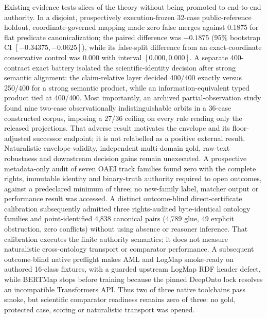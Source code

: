 Existing evidence tests slices of the theory without being promoted to
end-to-end authority. In a disjoint, prospectively execution-frozen 32-case
public-reference holdout, coordinate-governed mapping made zero false merges
against 0.1875 for flat predicate canonicalization; the paired difference was
$-0.1875$ (95\% bootstrap CI $[-0.34375,-0.0625]$), while its false-split
difference from an exact-coordinate conservative control was $0.000$ with
interval $[0.000,0.000]$. A separate 400-contract exact battery isolated the
scientific-identity decision after strong semantic alignment: the
claim-relative layer decided 400/400 exactly versus 250/400 for a strong
semantic product, while an information-equivalent typed product tied at
400/400. Most importantly, an archived partial-observation study found nine
two-case observationally indistinguishable orbits in a 36-case constructed
corpus, imposing a 27/36 ceiling on every rule reading only the released
projections. That adverse result motivates the envelope and its
floor-adjusted successor endpoint; it is not relabelled as a positive external
result. Naturalistic envelope validity, independent multi-domain gold,
raw-text robustness and downstream decision gains remain unexecuted. A
prospective metadata-only audit of seven OAEI track families found zero with
the complete rights, immutable identity and binary-truth authority required to
open outcomes, against a predeclared minimum of three; no new-family label,
matcher output or performance result was accessed. A distinct outcome-blind
direct-certificate calibration subsequently admitted three rights-audited
byte-identical ontology families and point-identified 4,838 canonical pairs
(4,789 glue, 49 explicit obstruction, zero conflicts) without using absence or
reasoner inference. That calibration executes the finite authority semantics;
it does not measure naturalistic cross-ontology transport or comparator
performance. A subsequent outcome-blind native preflight makes AML and LogMap
smoke-ready on authored 16-class fixtures, with a guarded upstream LogMap RDF
header defect, while BERTMap stops before training because the pinned DeepOnto
lock resolves an incompatible Transformers API. Thus two of three native
toolchains pass smoke, but scientific comparator readiness remains zero of
three: no gold, protected case, scoring or naturalistic transport was opened.
\endinput
